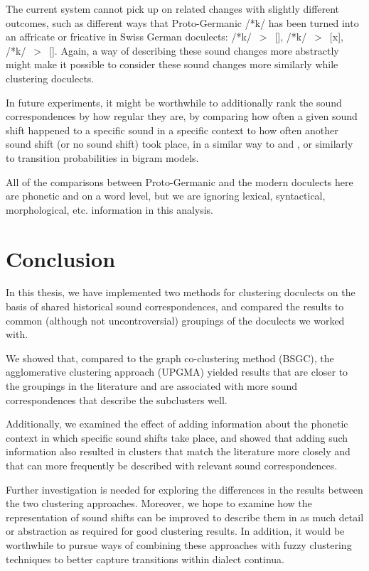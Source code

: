 \documentclass[a4paper]{article}
\begin{document}

The current system cannot pick up on related changes
with slightly different outcomes, such as different
ways that Proto-Germanic /*k/ has been turned into
an affricate or fricative in Swiss German doculects:
/*k/~$>$~[], /*k/~$>$~[x], /*k/~$>$~[\textchi].
Again, a way of describing these sound changes more abstractly
might make it possible to consider these sound changes more
similarly while clustering doculects.

In future experiments, it might be worthwhile to additionally rank
the sound correspondences by how regular they are,
by comparing how often a given sound shift happened
to a specific sound in a specific context
to how often another sound shift (or no sound shift) took place,
in a similar way to \citet{prokic2007identifying} and \citet{prokic2013combining},
or similarly to transition probabilities in bigram models.

All of the comparisons between Proto-Germanic and the modern doculects
here are phonetic
and on a word level, but we are ignoring
lexical, syntactical, morphological, etc. information in this analysis.

\section{Conclusion}
\label{sec:conclusion}

In this thesis, we have implemented two methods
for clustering doculects on the basis of shared
historical sound correspondences,
and compared the results to common (although not uncontroversial)
groupings of the doculects we worked with.

We showed that, compared to the graph co-clustering method (BSGC),
the agglomerative clustering approach (UPGMA)
yielded results that are closer to the groupings in the literature
and are associated with more sound correspondences that
describe the subclusters well.

Additionally, we examined the effect of adding information about
the phonetic context in which specific sound shifts take place,
and showed that adding such information also resulted in
clusters that match the literature more closely and that
can more frequently be described with relevant sound correspondences.

Further investigation is needed for exploring the
differences in the results between the two clustering approaches.
Moreover, we hope to examine how the representation of
sound shifts can be improved to describe them in
as much detail or abstraction as required for good clustering results.
In addition, it would be worthwhile to pursue ways
of combining these approaches with fuzzy clustering techniques
to better capture transitions within dialect continua.



\end{document}
